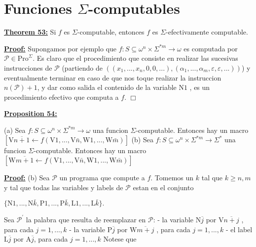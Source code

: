 \section{Funciones $\Sigma$-computables}


\textbf{\underline{Theorem 53:}} Si \(f\) es \(\Sigma \)-computable, entonces \(f\) es \(\Sigma \)-efectivamente computable.


\textbf{\underline{Proof:}} Supongamos por ejemplo que \(f:S\subseteq \omega ^{n}\times \Sigma ^{\ast m}\rightarrow \omega \) es computada por \(\mathcal{P}\in \mathrm{Pro}^{\Sigma }\). Es claro que el procedimiento que consiste en realizar las sucesivas instrucciones de \(\mathcal{P}\) (partiendo de \(((x_{1},...,x_{n},0,0,...),( \alpha _{1},...,\alpha _{m},\varepsilon ,\varepsilon ,...))\)) y eventualmente terminar en caso de que nos toque realizar la instruccion \(n( \mathcal{P})+1\), y dar como salida el contenido de la variable \(\mathrm{N}1\) , es un procedimiento efectivo que computa a \(f\). \(\Box\)


\textbf{\underline{Proposition 54:}}

(a) Sea \(f:S\subseteq \omega ^{n}\times \Sigma ^{\ast m}\rightarrow \omega \) una funcion \(\Sigma \)-computable. Entonces hay un macro
\(\displaystyle \left[ \mathrm{V}\overline{n+1}\leftarrow f(\mathrm{V}1,...,\mathrm{V}\bar{n} ,\mathrm{W}1,...,\mathrm{W}\bar{m})\right] \)
(b) Sea \(f:S\subseteq \omega ^{n}\times \Sigma ^{\ast m}\rightarrow \Sigma ^{\ast }\) una funcion \(\Sigma \)-computable. Entonces hay un macro
\(\displaystyle \left[ \mathrm{W}\overline{m+1}\leftarrow f(\mathrm{V}1,...,\mathrm{V}\bar{n} ,\mathrm{W}1,...,\mathrm{W}\bar{m})\right] \)

\textbf{\underline{Proof:}} (b) Sea \(\mathcal{P}\) un programa que compute a \(f\). Tomemos un \(k\) tal que \( k\geq n,m\) y tal que todas las variables y labels de \(\mathcal{P}\) estan en el conjunto

\(\displaystyle \{\mathrm{N}1,...,\mathrm{N}\bar{k},\mathrm{P}1,...,\mathrm{P}\bar{k}, \mathrm{L}1,...,\mathrm{L}\bar{k}\}\text{.} \)

Sea \(\mathcal{P}^{\prime }\) la palabra que resulta de reemplazar en \( \mathcal{P}\):
- la variable \(\mathrm{N}\overline{j}\) por \(\mathrm{V}\overline{n+j}\) , para cada \(j=1,...,k\)
- la variable \(\mathrm{P}\overline{j}\) por \(\mathrm{W}\overline{m+j}\) , para cada \(j=1,...,k\)
- el label \(\mathrm{L}\overline{j}\) por \(\mathrm{A}\overline{j}\), para cada \(j=1,...,k\)
Notese que

